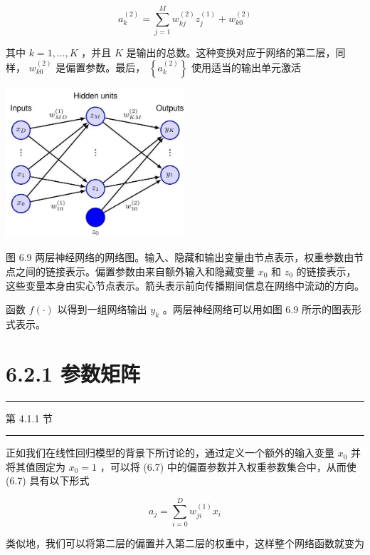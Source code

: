 \documentclass[10pt]{article}
\newcommand{\HRule}{\begin{center}\rule{0.9\linewidth}{0.2mm}\end{center}}
\begin{document}
\[
{a}_{k}^{\left( 2\right) } = \mathop{\sum }\limits_{{j = 1}}^{M}{w}_{kj}^{\left( 2\right) }{z}_{j}^{\left( 1\right) } + {w}_{k0}^{\left( 2\right) } \tag{6.9}
\]

其中 \(k = 1,\ldots ,K\) ，并且 \(K\) 是输出的总数。这种变换对应于网络的第二层，同样， \({w}_{k0}^{\left( 2\right) }\) 是偏置参数。最后， \(\left\{  {a}_{k}^{\left( 2\right) }\right\}\) 使用适当的输出单元激活

\begin{center}
\includegraphics[max width=0.5\textwidth]{images/0194e279-9b28-703a-88f4-c3ac21e2010d_200_921_351_618_515_0.jpg}
\end{center}
\hspace*{3em} 

图 6.9 两层神经网络的网络图。输入、隐藏和输出变量由节点表示，权重参数由节点之间的链接表示。偏置参数由来自额外输入和隐藏变量 \({x}_{0}\) 和 \({z}_{0}\) 的链接表示，这些变量本身由实心节点表示。箭头表示前向传播期间信息在网络中流动的方向。

函数 \(f\left( \cdot \right)\) 以得到一组网络输出 \({y}_{k}\) 。两层神经网络可以用如图 6.9 所示的图表形式表示。

\section*{6.2.1 参数矩阵}

\HRule

第 4.1.1 节

\HRule

正如我们在线性回归模型的背景下所讨论的，通过定义一个额外的输入变量 \({x}_{0}\) 并将其值固定为 \({x}_{0} = 1\) ，可以将 (6.7) 中的偏置参数并入权重参数集合中，从而使 (6.7) 具有以下形式

\[
{a}_{j} = \mathop{\sum }\limits_{{i = 0}}^{D}{w}_{ji}^{\left( 1\right) }{x}_{i} \tag{6.10}
\]

类似地，我们可以将第二层的偏置并入第二层的权重中，这样整个网络函数就变为
\end{document}
